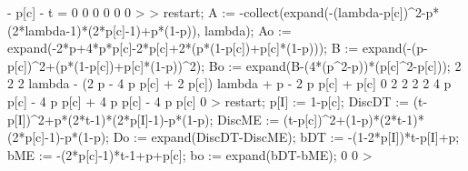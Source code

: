     - p[c] - t = 0
                               0
                               0
                               0
                               0
                               0
> 
> restart; A := -collect(expand(-(lambda-p[c])^2-p*(2*lambda-1)*(2*p[c]-1)+p*(1-p)), lambda); Ao := expand(-2*p+4*p*p[c]-2*p[c]+2*(p*(1-p[c])+p[c]*(1-p))); B := expand(-(p-p[c])^2+(p*(1-p[c])+p[c]*(1-p))^2); Bo := expand(B-(4*(p^2-p))*(p[c]^2-p[c]));
      2                                       2                  2
lambda  - (2 p - 4 p p[c] + 2 p[c]) lambda + p  - 2 p p[c] + p[c] 
                               0
                       2           2     2           2
         4 p p[c] - 4 p  p[c] + 4 p  p[c]  - 4 p p[c] 
                               0
> restart; p[I] := 1-p[c]; DiscDT := (t-p[I])^2+p*(2*t-1)*(2*p[I]-1)-p*(1-p); DiscME := (t-p[c])^2+(1-p)*(2*t-1)*(2*p[c]-1)-p*(1-p); Do := expand(DiscDT-DiscME); bDT := -(1-2*p[I])*t-p[I]+p; bME := -(2*p[c]-1)*t-1+p+p[c]; bo := expand(bDT-bME);
                               0
                               0
> 
